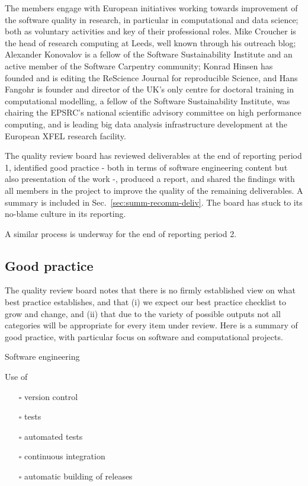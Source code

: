 \documentclass{deliverablereport}
\makeatletter
\renewcommand\subsubsection{\@startsection{subsubsection}{2}%
  \z@{.5\linespacing\@plus.7\linespacing}{.1\linespacing}%
  {\normalfont\bfseries}}
\makeatother
\begin{document}
The members engage with European initiatives working towards
improvement of the software quality in research, in particular in
computational and data science; both as voluntary activities and key
of their professional roles. Mike Croucher is the head of research
computing at Leeds, well known through his outreach blog; Alexander Konovalov
is a fellow of the Software Sustainability Institute and an active
member of the Software Carpentry community; Konrad Hinsen has
founded and is editing the ReScience Journal for reproducible Science,
and Hans Fangohr is founder and director of the UK's only centre for
doctoral training in computational modelling, a fellow of the Software
Sustainability Institute, was chairing the EPSRC's national scientific
advisory committee on high performance computing, and is leading big
data analysis infrastructure development at the European XFEL research
facility.

The quality review board has reviewed deliverables at the end of
reporting period 1, identified good practice - both in terms of
software engineering content but also presentation of the work -,
produced a report, and shared the findings with all members in the
project to improve the quality of the remaining deliverables. A
summary is included in Sec.~\ref{sec:summ-recomm-deliv}. The
board has stuck to its no-blame culture in its reporting.

A similar process is underway for the end of reporting period 2.


\subsection{Good practice}

The quality review board notes that there is no firmly established
view on what best practice establishes, and that (i) we expect our
best practice checklist to grow and change, and (ii) that due to the
variety of possible outputs not all categories will be appropriate for
every item under review. Here is a summary of good practice, with
particular focus on software and computational projects.

\subsubsection{Software engineering}
\label{sec:org2e9824e}

Use of
\begin{itemize}
\item[{$\square$}] version control
\item[{$\square$}] tests
\item[{$\square$}] automated tests
\item[{$\square$}] continuous integration
\item[{$\square$}] automatic building of releases
\end{itemize}
\end{document}
